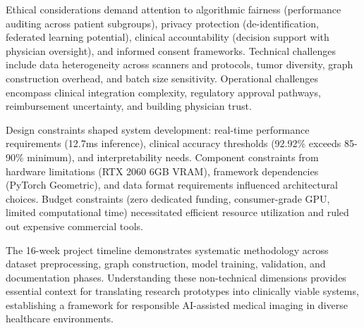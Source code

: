 Ethical considerations demand attention to algorithmic fairness (performance auditing across patient subgroups), privacy protection (de-identification, federated learning potential), clinical accountability (decision support with physician oversight), and informed consent frameworks. Technical challenges include data heterogeneity across scanners and protocols, tumor diversity, graph construction overhead, and batch size sensitivity. Operational challenges encompass clinical integration complexity, regulatory approval pathways, reimbursement uncertainty, and building physician trust.

Design constraints shaped system development: real-time performance requirements (12.7ms inference), clinical accuracy thresholds (92.92\% exceeds 85-90\% minimum), and interpretability needs. Component constraints from hardware limitations (RTX 2060 6GB VRAM), framework dependencies (PyTorch Geometric), and data format requirements influenced architectural choices. Budget constraints (zero dedicated funding, consumer-grade GPU, limited computational time) necessitated efficient resource utilization and ruled out expensive commercial tools.

The 16-week project timeline demonstrates systematic methodology across dataset preprocessing, graph construction, model training, validation, and documentation phases. Understanding these non-technical dimensions provides essential context for translating research prototypes into clinically viable systems, establishing a framework for responsible AI-assisted medical imaging in diverse healthcare environments.

\clearpage